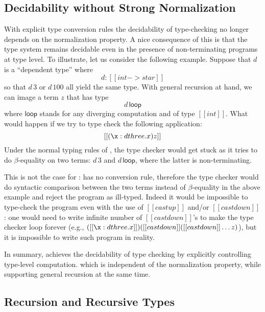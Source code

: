 \subsection{Decidability without Strong Normalization}

With explicit type conversion rules the decidability of type-checking 
no longer depends on the normalization property. 
A nice consequence of this is that the type system remains decidable
even in the presence of non-terminating programs at type level.
To illustrate, let us consider the following example. Suppose that $d$ is a ``dependent type'' where
\[d : [[int -> star]]\] so that $d\,3$ or $d\,100$ all yield the same
type. With general recursion at hand, we can image a term $z$ that has
type \[d\,\mathsf{loop}\] where $\mathsf{loop}$ stands for any
diverging computation and of type $[[int]]$. What would happen if we
try to type check the following application: \[ [[(\x: d three.x)z]]\]
Under the normal typing rules of \coc, the type checker would get
stuck as it tries to do $\beta$-equality on two terms: $d\,3$ and
$d\,\mathsf{loop}$, where the latter is non-terminating.

This is not the case for \name: \name has no conversion rule,
therefore the type checker would do syntactic comparison between the
two terms instead of $\beta$-equality in the above example and reject
the program as ill-typed. Indeed it would be impossible to type-check
the program even with the use of $[[castup]]$ and/or $[[castdown]]$:
one would need to write infinite number of $[[castdown]]$'s to make
the type checker loop forever (e.g., $([[\x:d
three.x]])([[castdown]]([[castdown]] \dots z) $), but it is impossible
to write such program in reality.

In summary, \name achieves the decidability of type checking by
explicitly controlling type-level computation.  which is independent of
the normalization property, while supporting general recursion at the
same time.

\subsection{Recursion and Recursive Types}


